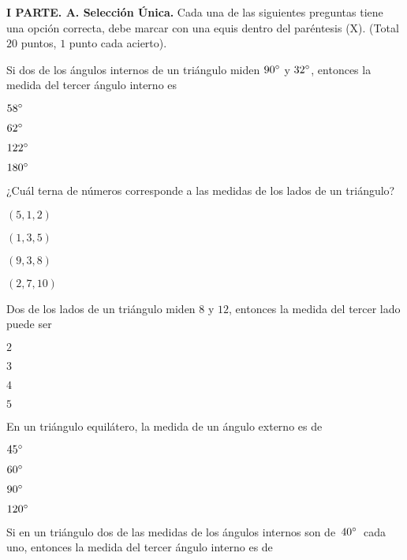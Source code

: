 \documentclass[12pt, fleqn]{article}
\begin{document}
\setcounter{page}{2}

\vspace{-1.5cm}


\sf

{\bf I PARTE. A. Selección Única.} Cada una de las siguientes preguntas tiene una opción correcta, debe marcar con una equis dentro del paréntesis (X). (Total $20$ puntos, $1$ punto cada acierto).

\benu %
\item Si dos de los ángulos internos de un triángulo miden $90^\circ$ y $32^\circ$, entonces la medida del tercer ángulo interno es \vp

\benu
\item[] \opc $58^\circ$\vf
\item[] \opc $62^\circ$\vf
\item[] \opc $122^\circ$\vf
\item[] \opc $180^\circ$
\eenu
\vs

\item ¿Cuál terna de números corresponde a las medidas de los lados de un triángulo?
\vp

\benu
\item[] \opc $(5,1,2)$\vf
\item[] \opc $(1,3,5)$\vf
\item[] \opc $(9,3,8)$\vf
\item[] \opc $(2,7,10)$
\eenu
\vs

\item Dos de los lados de un triángulo miden $8$ y $12$, entonces la medida del tercer lado puede ser
\vp

\benu
\item[] \opc $2$\vf
\item[] \opc $3$\vf
\item[] \opc $4$\vf
\item[] \opc $5$
\eenu
\vs

\item En un triángulo equilátero, la medida de un ángulo externo es de
\vp

\benu
\item[] \opc $45^\circ$\vf
\item[] \opc $60^\circ$\vf
\item[] \opc $90^\circ$\vf
\item[] \opc $120^\circ$
\eenu

\pagebreak

\item Si en un triángulo dos de las medidas de los ángulos internos son de $\,40^\circ\,$ cada uno, entonces la medida del tercer ángulo interno es de \vp
\end{document}
